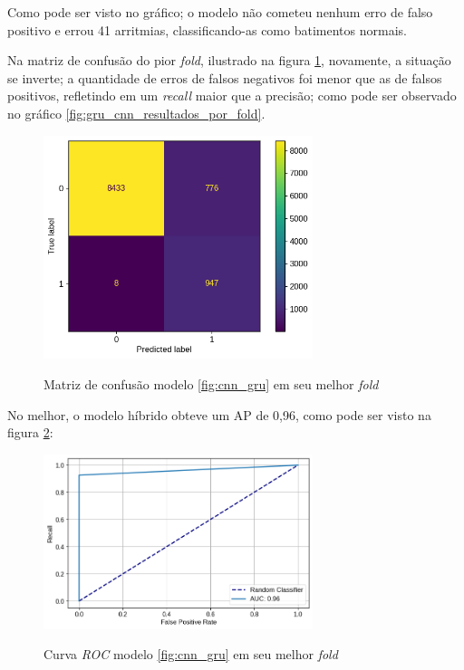 Como pode ser visto no gráfico; o modelo não cometeu nenhum erro de falso positivo e errou 41 arritmias, classificando-as
como batimentos normais. 

Na matriz de confusão do pior \textit{fold}, ilustrado na figura \ref{fig:matriz_confusao_cnn_gru_pior_fold}, novamente,
a situação se inverte; a quantidade de erros de falsos negativos foi menor que as de falsos positivos, refletindo em um
\textit{recall} maior que a precisão; como pode ser observado no gráfico \ref{fig:gru_cnn_resultados_por_fold}.

\begin{figure}[H]
  \centering
  \caption{Matriz de confusão modelo \ref{fig:cnn_gru} em seu melhor \textit{fold}}
   \includegraphics[width=0.7\textwidth]{figuras/modelos_resultados/gru_cnn/matriz_confusao_pior_fold_gru_cnn_3_alt.png} 
  \label{fig:matriz_confusao_cnn_gru_pior_fold}
\end{figure}


No melhor, o modelo híbrido obteve um AP de 0,96, como pode ser visto na figura \ref{fig:roc_cnn_gru_melhor_fold}:


\begin{figure}[H]
  \centering
  \caption{Curva \textit{ROC} modelo \ref{fig:cnn_gru} em seu melhor \textit{fold}}
   \includegraphics[width=0.7\textwidth]{figuras/modelos_resultados/gru_cnn/roc_cnn_melhor_fold_1.png} 
  \label{fig:roc_cnn_gru_melhor_fold}
\end{figure}

